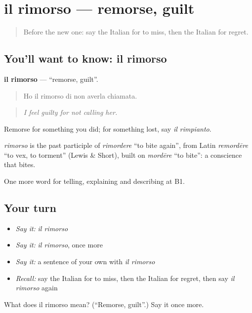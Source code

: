 \section[il rimorso]{il rimorso — remorse, guilt}

\label{lesson:IT-C477-rimorso}



\begin{quote}
Before the new one: say the Italian for to miss, then the Italian for regret.
\end{quote}

\subsection*{You'll want to know: il rimorso}
\textbf{il rimorso} — \textquotedblleft{}remorse, guilt\textquotedblright{}.

\begin{quote}
Ho il rimorso di non averla chiamata.
\end{quote}

\begin{quote}
\emph{I feel guilty for not calling her.}
\end{quote}

Remorse for something you did; for something lost, say \emph{il rimpianto}.

\begin{cousinweb}
\emph{rimorso} is the past participle of \emph{rimordere} \textquotedblleft{}to bite again\textquotedblright{}, from Latin \emph{remordēre} \textquotedblleft{}to vex, to torment\textquotedblright{} (Lewis \& Short), built on \emph{mordēre} \textquotedblleft{}to bite\textquotedblright{}: a conscience that bites.
\end{cousinweb}

\begin{grammarlens}[title={What you've built}]
One more word for telling, explaining and describing at B1.
\end{grammarlens}

\subsection*{Your turn}
\begin{itemize}
\raggedright
  \item \emph{Say it:} \emph{il rimorso}
  \item \emph{Say it:} \emph{il rimorso}, once more
  \item \emph{Say it:} a sentence of your own with \emph{il rimorso}
  \item \emph{Recall:} say the Italian for to miss, then the Italian for regret, then say \emph{il rimorso} again
\end{itemize}

\begin{tcolorbox}[breakable,colback=teal!4,colframe=teal!35!black,title={Before you move on}]
What does il rimorso mean? (\textquotedblleft{}Remorse, guilt\textquotedblright{}.) Say it once more.
\end{tcolorbox}
